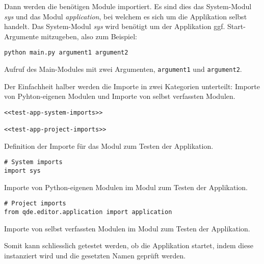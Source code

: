 \documentclass[10pt, openright, notitlepage]{scrreprt}
\begin{document}
Dann werden die benötigen Module importiert. Es sind dies das System-Modul
\emph{sys} und das Modul \emph{application}, bei welchem es sich um die Applikation
selbst handelt. Das System-Modul \emph{sys} wird benötigt um der Applikation ggf.
Start-Argumente mitzugeben, also zum Beispiel:

\begin{listing}[H]
\begin{verbatim}
python main.py argument1 argument2
\end{verbatim}
\caption{\label{org99f7f0d}
Aufruf des Main-Modules mit zwei Argumenten, \texttt{argument1} und \texttt{argument2}.}
\end{listing}

Der Einfachheit halber werden die Importe in zwei Kategorien unterteilt: Importe
von Pyhton-eigenen Modulen und Importe von selbst verfassten Modulen.

\begin{listing}[H]
\begin{verbatim}
<<test-app-system-imports>>

<<test-app-project-imports>>
\end{verbatim}
\caption{\label{org148d5ae}
Definition der Importe für das Modul zum Testen der Applikation.}
\end{listing}

\begin{listing}[H]
\begin{verbatim}
# System imports
import sys
\end{verbatim}
\caption{\label{org91fba36}
Importe von Python-eigenen Modulen im Modul zum Testen der Applikation.}
\end{listing}

\begin{listing}[H]
\begin{verbatim}
# Project imports
from qde.editor.application import application
\end{verbatim}
\caption{\label{orgc9a8396}
Importe von selbst verfassten Modulen im Modul zum Testen der Applikation.}
\end{listing}

Somit kann schliesslich getestet werden, ob die Applikation startet, indem diese
instanziert wird und die gesetzten Namen geprüft werden.
\end{document}
